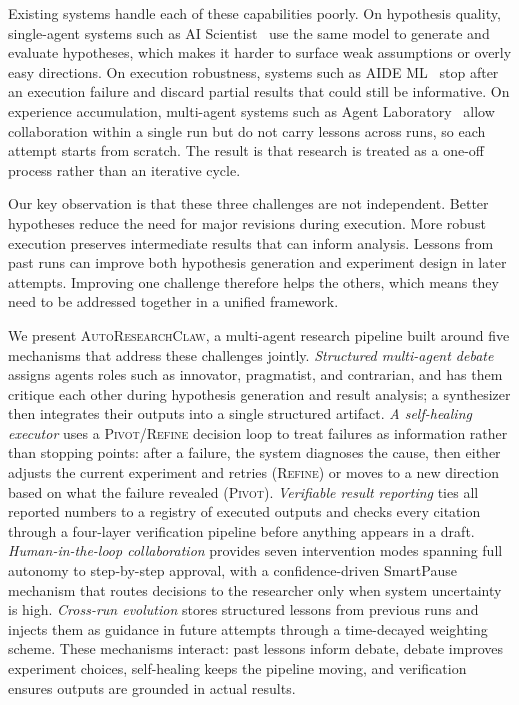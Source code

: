 \documentclass{llmxive}
\providecommand{\system}{\textsc{AutoResearchClaw}}
\begin{document}
Existing systems handle each of these capabilities poorly.
On hypothesis quality, single-agent systems such as AI Scientist~\citep{lu2024aiscientist, yamada2025aiscientistv2} use the same model to generate and evaluate hypotheses, which makes it harder to surface weak assumptions or overly easy directions.
On execution robustness, systems such as AIDE ML~\citep{aide2025} stop after an execution failure and discard partial results that could still be informative.
On experience accumulation, multi-agent systems such as Agent Laboratory~\citep{schmidgall2025agentlab} allow collaboration within a single run but do not carry lessons across runs, so each attempt starts from scratch.
The result is that research is treated as a one-off process rather than an iterative cycle.

Our key observation is that these three challenges are not independent.
Better hypotheses reduce the need for major revisions during execution.
More robust execution preserves intermediate results that can inform analysis.
Lessons from past runs can improve both hypothesis generation and experiment design in later attempts.
Improving one challenge therefore helps the others, which means they need to be addressed together in a unified framework.

We present \system{}, a multi-agent research pipeline built around five mechanisms that address these challenges jointly.
\textit{Structured multi-agent debate} assigns agents roles such as innovator, pragmatist, and contrarian, and has them critique each other during hypothesis generation and result analysis; a synthesizer then integrates their outputs into a single structured artifact.
\textit{A self-healing executor} uses a \textsc{Pivot}/\textsc{Refine} decision loop to treat failures as information rather than stopping points: after a failure, the system diagnoses the cause, then either adjusts the current experiment and retries (\textsc{Refine}) or moves to a new direction based on what the failure revealed (\textsc{Pivot}).
\textit{Verifiable result reporting} ties all reported numbers to a registry of executed outputs and checks every citation through a four-layer verification pipeline before anything appears in a draft.
\textit{Human-in-the-loop collaboration} provides seven intervention modes spanning full autonomy to step-by-step approval, with a confidence-driven SmartPause mechanism that routes decisions to the researcher only when system uncertainty is high.
\textit{Cross-run evolution} stores structured lessons from previous runs and injects them as guidance in future attempts through a time-decayed weighting scheme.
These mechanisms interact: past lessons inform debate, debate improves experiment choices, self-healing keeps the pipeline moving, and verification ensures outputs are grounded in actual results.
\end{document}

